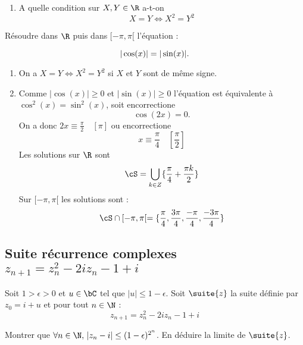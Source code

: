 \begin{exercice}
\begin{enumerate}
\item A quelle condition sur $X,Y\in \R$ a-t-on 
$$X=Y \Longleftrightarrow X^2=Y^2  $$
\end{enumerate}
\item Résoudre dans $\R$ puis dans $[-\pi, \pi[$ l'équation :

\begin{equation}
|\cos(x)|=|\sin(x)|.\\
\end{equation}

\end{exercice}

\begin{correction}
\begin{enumerate}
\item On a  $X=Y \Longleftrightarrow X^2=Y^2  $ si $X$ et $Y$ sont de même signe.
\item Comme $|\cos(x)|\geq 0$ et $|\sin(x)|\geq 0$ l'équation est équivalente à $\cos^2(x) =\sin^2(x)$, soit encorrectione 
$$\cos(2x)=0.$$
On a donc $2x\equiv \frac{\pi}{2}\quad [\pi]$ ou encorrectione 
$$x\equiv \frac{\pi}{4}\quad [\frac{\pi}{2}]$$
 Les solutions sur $\R$ sont 
 $$\cS =\bigcup_{k\in Z} \{ \frac{\pi}{4}+\frac{\pi k}{2}\}$$
 Sur $[-\pi, \pi[$  les solutions sont :
 $$\cS\cap [-\pi, \pi[ =  \{ \frac{\pi}{4}, \frac{3\pi}{4}, \frac{-\pi}{4}, \frac{-3\pi}{4}\}$$
 




\end{enumerate}
\end{correction}



\subsection{Suite récurrence complexes $z_{n+1} = z_n^2 -2iz_n-1+i$}


\begin{exercice}
Soit $1>\epsilon >0$ et $u\in \bC$ tel que $|u| \leq 1-\epsilon$.
Soit $\suite{z}$ la suite définie par $z_0= i+u$ et pour tout $n\in \N$ :
$$z_{n+1} = z_n^2 -2iz_n-1+i$$

Montrer que $\forall n\in \N,\, |z_n-i|\leq (1-\epsilon)^{2^n}$. En déduire la limite de $\suite{z}$.
\end{exercice}

